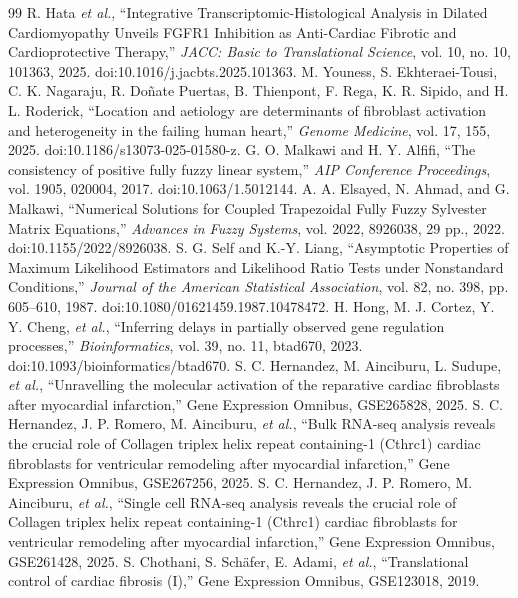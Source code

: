 \documentclass[preprint,11pt]{elsarticle}
\begin{document}
\begin{thebibliography}{99}
 R. Hata \emph{et al.}, ``Integrative Transcriptomic-Histological Analysis in Dilated Cardiomyopathy Unveils FGFR1 Inhibition as Anti-Cardiac Fibrotic and Cardioprotective Therapy,'' \emph{JACC: Basic to Translational Science}, vol. 10, no. 10, 101363, 2025. doi:10.1016/j.jacbts.2025.101363.
 M. Youness, S. Ekhteraei-Tousi, C. K. Nagaraju, R. Do\~nate Puertas, B. Thienpont, F. Rega, K. R. Sipido, and H. L. Roderick, ``Location and aetiology are determinants of fibroblast activation and heterogeneity in the failing human heart,'' \emph{Genome Medicine}, vol. 17, 155, 2025. doi:10.1186/s13073-025-01580-z.
 G. O. Malkawi and H. Y. Alfifi, ``The consistency of positive fully fuzzy linear system,'' \emph{AIP Conference Proceedings}, vol. 1905, 020004, 2017. doi:10.1063/1.5012144.
 A. A. Elsayed, N. Ahmad, and G. Malkawi, ``Numerical Solutions for Coupled Trapezoidal Fully Fuzzy Sylvester Matrix Equations,'' \emph{Advances in Fuzzy Systems}, vol. 2022, 8926038, 29 pp., 2022. doi:10.1155/2022/8926038.
 S. G. Self and K.-Y. Liang, ``Asymptotic Properties of Maximum Likelihood Estimators and Likelihood Ratio Tests under Nonstandard Conditions,'' \emph{Journal of the American Statistical Association}, vol. 82, no. 398, pp. 605--610, 1987. doi:10.1080/01621459.1987.10478472.
 H. Hong, M. J. Cortez, Y. Y. Cheng, \emph{et al.}, ``Inferring delays in partially observed gene regulation processes,'' \emph{Bioinformatics}, vol. 39, no. 11, btad670, 2023. doi:10.1093/bioinformatics/btad670.
 S. C. Hernandez, M. Ainciburu, L. Sudupe, \emph{et al.}, ``Unravelling the molecular activation of the reparative cardiac fibroblasts after myocardial infarction,'' Gene Expression Omnibus, GSE265828, 2025.
 S. C. Hernandez, J. P. Romero, M. Ainciburu, \emph{et al.}, ``Bulk RNA-seq analysis reveals the crucial role of Collagen triplex helix repeat containing-1 (Cthrc1) cardiac fibroblasts for ventricular remodeling after myocardial infarction,'' Gene Expression Omnibus, GSE267256, 2025.
 S. C. Hernandez, J. P. Romero, M. Ainciburu, \emph{et al.}, ``Single cell RNA-seq analysis reveals the crucial role of Collagen triplex helix repeat containing-1 (Cthrc1) cardiac fibroblasts for ventricular remodeling after myocardial infarction,'' Gene Expression Omnibus, GSE261428, 2025.
 S. Chothani, S. Sch\"afer, E. Adami, \emph{et al.}, ``Translational control of cardiac fibrosis (I),'' Gene Expression Omnibus, GSE123018, 2019.

\end{thebibliography}
\end{document}
